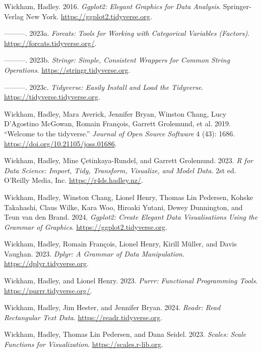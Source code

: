 \documentclass[
  notitlepage]{book}
\newlength{\cslhangindent}
\newenvironment{cslreferences}%
  {\setlength{\parindent}{0pt}%
  \everypar{\setlength{\hangindent}{\cslhangindent}}\ignorespaces}%
  {\par}
\begin{document}
\begin{cslreferences}
\leavevmode\hypertarget{ref-ggplot22016}{}%
Wickham, Hadley. 2016. \emph{Ggplot2: Elegant Graphics for Data Analysis}. Springer-Verlag New York. \url{https://ggplot2.tidyverse.org}.

\leavevmode\hypertarget{ref-R-forcats}{}%
---------. 2023a. \emph{Forcats: Tools for Working with Categorical Variables (Factors)}. \url{https://forcats.tidyverse.org/}.

\leavevmode\hypertarget{ref-R-stringr}{}%
---------. 2023b. \emph{Stringr: Simple, Consistent Wrappers for Common String Operations}. \url{https://stringr.tidyverse.org}.

\leavevmode\hypertarget{ref-R-tidyverse}{}%
---------. 2023c. \emph{Tidyverse: Easily Install and Load the Tidyverse}. \url{https://tidyverse.tidyverse.org}.

\leavevmode\hypertarget{ref-tidyverse2019}{}%
Wickham, Hadley, Mara Averick, Jennifer Bryan, Winston Chang, Lucy D'Agostino McGowan, Romain François, Garrett Grolemund, et al. 2019. ``Welcome to the tidyverse.'' \emph{Journal of Open Source Software} 4 (43): 1686. \url{https://doi.org/10.21105/joss.01686}.

\leavevmode\hypertarget{ref-Wickham2023}{}%
Wickham, Hadley, Mine Çetinkaya-Rundel, and Garrett Grolemund. 2023. \emph{R for Data Science: Import, Tidy, Transform, Visualize, and Model Data}. 2st ed. O'Reilly Media, Inc. \url{https://r4ds.hadley.nz/}.

\leavevmode\hypertarget{ref-R-ggplot2}{}%
Wickham, Hadley, Winston Chang, Lionel Henry, Thomas Lin Pedersen, Kohske Takahashi, Claus Wilke, Kara Woo, Hiroaki Yutani, Dewey Dunnington, and Teun van den Brand. 2024. \emph{Ggplot2: Create Elegant Data Visualisations Using the Grammar of Graphics}. \url{https://ggplot2.tidyverse.org}.

\leavevmode\hypertarget{ref-R-dplyr}{}%
Wickham, Hadley, Romain François, Lionel Henry, Kirill Müller, and Davis Vaughan. 2023. \emph{Dplyr: A Grammar of Data Manipulation}. \url{https://dplyr.tidyverse.org}.

\leavevmode\hypertarget{ref-R-purrr}{}%
Wickham, Hadley, and Lionel Henry. 2023. \emph{Purrr: Functional Programming Tools}. \url{https://purrr.tidyverse.org/}.

\leavevmode\hypertarget{ref-R-readr}{}%
Wickham, Hadley, Jim Hester, and Jennifer Bryan. 2024. \emph{Readr: Read Rectangular Text Data}. \url{https://readr.tidyverse.org}.

\leavevmode\hypertarget{ref-R-scales}{}%
Wickham, Hadley, Thomas Lin Pedersen, and Dana Seidel. 2023. \emph{Scales: Scale Functions for Visualization}. \url{https://scales.r-lib.org}.


\end{cslreferences}
\end{document}
